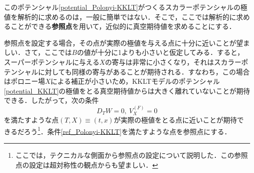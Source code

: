 \documentclass[a4paper,uplatex,dvipdfmx]{jsarticle}
\theoremstyle{definition}
\begin{document}
このポテンシャル\eqref{potential_Polonyi-KKLT}がつくるスカラーポテンシャルの極値を解析的に求めるのは，一般に簡単ではない．そこで，ここでは解析的に求めることができる\textbf{参照点}を用いて，近似的に真空期待値を求めることにする．

参照点を設定する場合，その点が実際の極値を与える点に十分に近いことが望ましい．さて，ここでは$B$の値が十分に1よりも小さいと仮定してみる．すると，スーパーポテンシャルに与える$X$の寄与は非常に小さくなり，それはスカラーポテンシャルに対しても同様の寄与があることが期待される．すなわち，この場合はポロニー場$X$による補正が小さいため，KKLTモデルのポテンシャル\eqref{potential_KKLT}の極値をとる真空期待値からは大きく離れていないことが期待できる．したがって，次の条件
\begin{equation}
   D_{T}W
   =
   0
   ,\ 
   V^{(F)}_{X}
   =
   0
   \label{ref_Polonyi-KKLT}
\end{equation}
を満たすような点$(T,X)\equiv(t,x)$が実際の極値をとる点に近いことが期待できるだろう\footnote{
   ここでは，テクニカルな側面から参照点の設定について説明した．この参照点の設定は超対称性の観点からも望ましい．
}．条件\eqref{ref_Polonyi-KKLT}を満たすような点を参照点にする．
\end{document}
